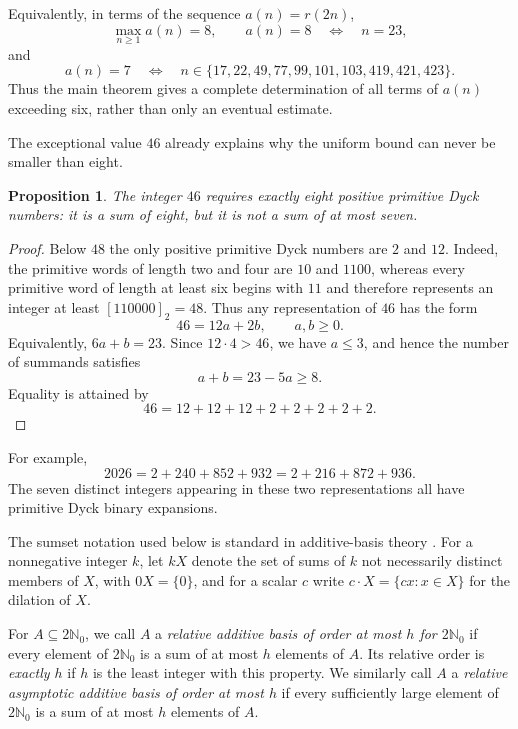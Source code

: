 \documentclass[12pt]{article}
\theoremstyle{plain}
\newtheorem{proposition}[theorem]{Proposition}
\begin{document}
Equivalently, in terms of the sequence $a(n)=r(2n)$,
\[
        \max_{n\geq1}a(n)=8,
        \qquad
        a(n)=8\quad\Longleftrightarrow\quad n=23,
\]
and
\[
 a(n)=7
 \quad\Longleftrightarrow\quad
 n\in\{17,22,49,77,99,101,103,419,421,423\}.
\]
Thus the main theorem gives a complete determination of all terms of
$a(n)$ exceeding six, rather than only an eventual estimate.

The exceptional value $46$ already explains why the uniform bound can
never be smaller than eight.

\begin{proposition}\label{prop:46}
The integer $46$ requires exactly eight positive primitive Dyck numbers:
it is a sum of eight, but it is not a sum of at most seven.
\end{proposition}

\begin{proof}
Below $48$ the only positive primitive Dyck numbers are $2$ and $12$.
Indeed, the primitive words of length two and four are $10$ and $1100$,
whereas every primitive word of length at least six begins with $11$ and
therefore represents an integer at least $[110000]_2=48$.  Thus any
representation of $46$ has the form
\[
        46=12a+2b,\qquad a,b\geq0.
\]
Equivalently, $6a+b=23$.  Since $12\cdot4>46$, we have $a\leq3$, and
hence the number of summands satisfies
\[
        a+b=23-5a\geq8.
\]
Equality is attained by
\[
        46=12+12+12+2+2+2+2+2.
\]
\end{proof}

For example,
\[
 2026=2+240+852+932=2+216+872+936.
\]
The seven distinct integers appearing in these two representations all
have primitive Dyck binary expansions.

The sumset notation used below is standard in additive-basis theory
\cite[Chap.\ 1]{Nathanson}.  For a nonnegative integer $k$, let $kX$ denote the
set of sums of $k$ not necessarily distinct members of $X$, with
$0X=\{0\}$, and for a scalar $c$ write
$c\cdot X=\{cx:x\in X\}$ for the dilation of $X$.

For $A\subseteq2\mathbb N_0$, we call $A$ a \emph{relative additive
basis of order at most $h$ for $2\mathbb N_0$} if every element of
$2\mathbb N_0$ is a sum of at most $h$ elements of $A$.  Its relative
order is \emph{exactly $h$} if $h$ is the least integer with this
property.  We similarly call $A$ a \emph{relative asymptotic additive
basis of order at most $h$} if every sufficiently large element of
$2\mathbb N_0$ is a sum of at most $h$ elements of $A$.  
\end{document}
